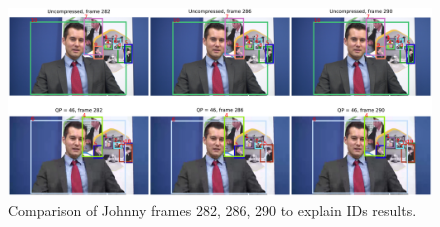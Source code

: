 \begin{figure}[!tb]
  \centering
  \includegraphics[width=1.0\linewidth]{img/Johnny_0_IDs.pdf}
  \caption[Comparison of Johnny frames 282, 286, 290 to explain IDs results]
  {
  Comparison of Johnny frames 282, 286, 290 to explain IDs results.
  }
  \label{fig:Johnny_0_IDs}
\end{figure}